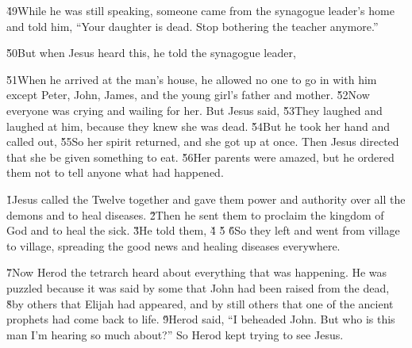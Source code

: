 \v{49}While he was still speaking, someone came from the synagogue leader's home and told him, ``Your daughter is dead. Stop bothering the teacher anymore.''

\v{50}But when Jesus heard this, he told the synagogue leader, 

\v{51}When he arrived at the man's house, he allowed no one to go in with him except Peter, John, James, and the young girl's father and mother. \v{52}Now everyone was crying and wailing for her. But Jesus said,  \v{53}They laughed and laughed at him, because they knew she was dead. \v{54}But he took her hand and called out,  \v{55}So her spirit returned, and she got up at once. Then Jesus directed that she be given something to eat. \v{56}Her parents were amazed, but he ordered them not to tell anyone what had happened.

\v{1}Jesus called the Twelve together and gave them power and authority over all the demons and to heal diseases. \v{2}Then he sent them to proclaim the kingdom of God and to heal the sick. \v{3}He told them,  \v{4} \v{5} \v{6}So they left and went from village to village, spreading the good news and healing diseases everywhere.

\v{7}Now Herod the tetrarch heard about everything that was happening. He was puzzled because it was said by some that John had been raised from the dead, \v{8}by others that Elijah had appeared, and by still others that one of the ancient prophets had come back to life. \v{9}Herod said, ``I beheaded John. But who is this man I'm hearing so much about?'' So Herod kept trying to see Jesus.

